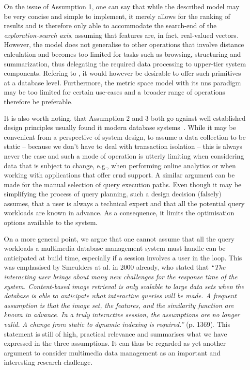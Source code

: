 On the issue of Assumption 1, one can say that while the described model may be very concise and simple to implement, it merely allows for the ranking of results and is therefore only able to accommodate the search-end of the \emph{exploration-search axis}, assuming that features are, in fact, real-valued vectors. However, the model does not generalise to other operations that involve distance calculation and becomes too limited for tasks such as browsing, structuring and summarization, thus delegating the required data processing to upper-tier system components. Refering to \cite{Jonson:2016Ten}, it would however be desirable to offer such primitives at a database level. Furthermore, the metric space model with its \acrfull{nns} paradigm may be too limited for certain use-cases and a broader range of operations therefore be preferable.

It is also worth noting, that Assumption 2 and 3 both go against well established design principles usually found it modern database systems~\cite{Petrov:2019Database,Amsaleg:2014Database}. While it may be convenient from a perspective of system design, to assume a data collection to be static -- because we don't have to deal with transaction isolation -- this is always never the case and such a mode of operation is utterly limiting when considering data that is subject to change, e.g., when performing online analytics or when working with applications that offer \acrshort{crud} support. A similar argument can be made for the manual selection of query execution paths. Even though it may be simplifying the process of query planning, such a design decision (falsely) assumes, that a user is always a technical expert and that all the potential query workloads are known in advance. As a consequence, it limits the optimisation options available to the system. 

On a more general point, we argue that one cannot assume that all the query workloads a multimedia database management system must handle can be anticipated at build time, especially if a session involves a user in the loop. This was emphasised by Smeulders at al. in 2000 already, who stated that \emph{``The interacting user brings about many new challenges for the response time of the system. Content-based image retrieval is only scalable to large data sets when the database is able to anticipate what interactive queries will be made. A frequent assumption is that the image set, the features, and the similarity function are known in advance. In a truly interactive session, the assumptions are no longer valid. A change from static to dynamic indexing is required.''} \cite{Smeulders:2000Content} (p. 1369). This statement is still of high, practical relevance and summarises what we have expressed in the three assumptions. It can thus be regarded as yet another argument to consider multimedia data management as an important and interesting research challenge.

